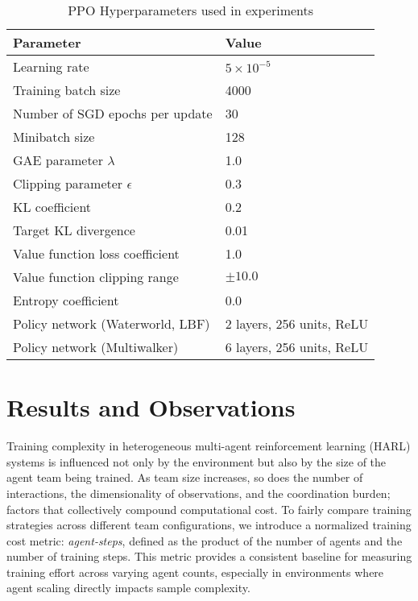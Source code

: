 \documentclass{article}
\begin{document}
\begin{table}[h]
    \centering
    \caption{PPO Hyperparameters used in experiments}
    \begin{tabular}{ll}
    \toprule
    \textbf{Parameter} & \textbf{Value} \\
    \midrule
    Learning rate & $5 \times 10^{-5}$ \\
    Training batch size & 4000 \\
    Number of SGD epochs per update & 30 \\
    Minibatch size & 128 \\
    GAE parameter $\lambda$ & 1.0 \\
    Clipping parameter $\epsilon$ & 0.3 \\
    KL coefficient & 0.2 \\
    Target KL divergence & 0.01 \\
    Value function loss coefficient & 1.0 \\
    Value function clipping range & $\pm 10.0$ \\
    Entropy coefficient & 0.0 \\
    Policy network (Waterworld, LBF) & 2 layers, 256 units, ReLU \\%
    Policy network (Multiwalker) & 6 layers, 256 units, ReLU \\%
    \bottomrule
    \end{tabular}
    \label{tab:ppo-hyperparams}
\end{table}

\FloatBarrier
\section{Results and Observations}

Training complexity in heterogeneous multi-agent reinforcement learning (HARL) 
systems is influenced not only by the environment but also by the size of the agent 
team being trained. As team size increases, so does the number of interactions, 
the dimensionality of observations, and the coordination burden; factors that collectively 
compound computational cost. To fairly compare training strategies across different 
team configurations, we introduce a normalized training cost metric: \emph{agent-steps}, 
defined as the product of the number of agents and the number of training steps. 
This metric provides a consistent baseline for measuring training effort across 
varying agent counts, especially in environments where agent scaling directly 
impacts sample complexity.
\end{document}

